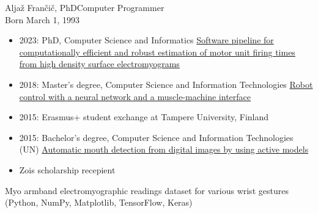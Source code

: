 \documentclass{article}
\begin{document}
\begin{cv}[avatar]{Aljaž Frančič, PhD}{Computer Programmer\\\small{Born March 1, 1993}}

\begin{cvevent}[2012][2023]
    \begin{itemize}
        \item 2023: PhD, Computer Science and Informatics \newline
            \href{https://dk.um.si/IzpisGradiva.php?id=84908}{Software pipeline for computationally efficient and robust estimation of motor unit firing times from high density surface electromyograms}
        \item 2018: Master’s degree, Computer Science and Information Technologies \newline
            \href{https://dk.um.si/IzpisGradiva.php?id=71712}{Robot control with a neural network and a muscle-machine interface}
        \item 2015: Erasmus+ student exchange at Tampere University, Finland
        \item 2015: Bachelor’s degree, Computer Science and Information Technologies (UN) \newline
            \href{https://dk.um.si/IzpisGradiva.php?id=48527}{Automatic mouth detection from digital images by using active models}
    \end{itemize}
\end{cvevent}

\begin{cvevent}[2008][2012]
        \begin{itemize}
            \item Zois scholarship recepient
        \end{itemize}
\end{cvevent}



\begin{cvevent}
    Myo armband electromyographic readings dataset for various wrist gestures (Python, NumPy, Matplotlib, TensorFlow, Keras)
\end{cvevent}



\end{cv}
\end{document}
